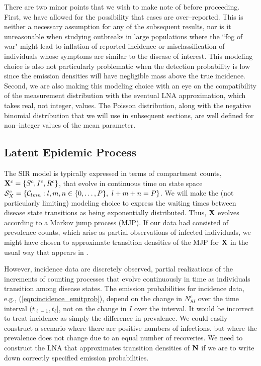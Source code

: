 There are two minor points that we wish to make note of before proceeding. First, we have allowed for the possibility that cases are over--reported. This is neither a necessary assumption for any of the subsequent results, nor is it unreasonable when studying outbreaks in large populations where the ``fog of war" might lead to inflation of reported incidence or misclassification of individuals whose symptoms are similar to the disease of interest. This modeling choice is also not particularly problematic when the detection probability is low since the emission densities will have negligible mass above the true incidence. Second, we are also making this modeling choice with an eye on the compatibility of the measurement distribution with the eventual LNA approximation, which takes real, not integer, values. The Poisson distribution, along with the negative binomial distribution that we will use in subsequent sections, are well defined for non--integer values of the mean parameter. 

\subsection{Latent Epidemic Process}
\label{subsec:lna_epid_proc}

The SIR model is typically expressed in terms of compartment counts, $ \mathbf{X}^c = \lbrace S^c,I^c,R^c\rbrace $, that evolve in continuous time on state space $ \mathcal{S}_X^c = \left \lbrace \mathcal{C}_{lmn}:l,m,n\in\lbrace0,\dots,P\rbrace,\ l+m+n=P\right \rbrace $. We will make the (not particularly limiting) modeling choice to express the waiting times between disease state transitions as being exponentially distributed. Thus, $ \mathbf{X} $ evolves according to a Markov jump process (MJP). If our data had consisted of prevalence counts, which arise as partial observations of infected individuals, we might have chosen to approximate transition densities of the MJP for $ \mathbf{X} $ in the usual way that appears in \cite{komorowski2009,fearnhead2014}. 

However, incidence data are discretely observed, partial realizations of the increments of counting processes that evolve continuously in time as individuals transition among disease states. The emission probabilities for incidence data, e.g., (\ref{eqn:incidence_emitprob}), depend on the change in $ N_{SI}^c $ over the time interval $ (t_{\ell-1},t_\ell] $, not on the change in $ I $ over the interval. It would be incorrect to treat incidence as simply the difference in prevalence. We could easily construct a scenario where there are positive numbers of infections, but where the prevalence does not change due to an equal number of recoveries. We need to construct the LNA that approximates transition densities of $ \mathbf{N} $ if we are to write down correctly specified emission probabilities.

